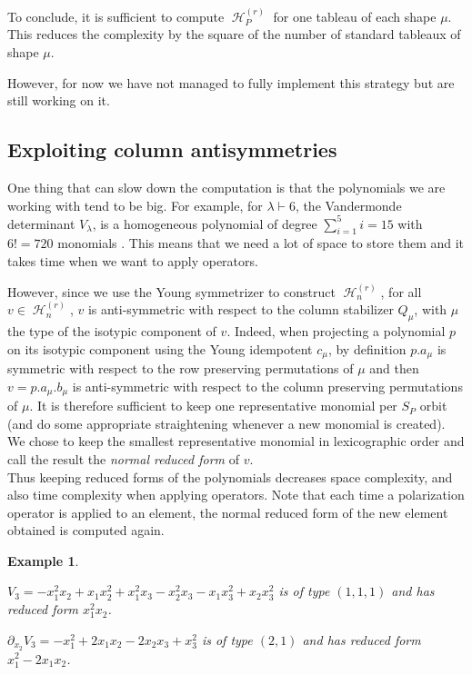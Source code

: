 \documentclass[letter,12pt]{article}
\newcommand{\pauline}[1]{\todo[linecolor=blue,backgroundcolor=cyan!25,bordercolor=blue]{#1}}
\DeclareMathOperator{\harmonics}{\mathcal{H}}
\newtheorem{example}{Example}
\begin{document}
	To conclude, it is sufficient to compute $\harmonics_P^{(r)}$ for one tableau of each shape $\mu$. This reduces the complexity by the square of the number of standard tableaux of shape $\mu$.
	
	However, for now we have not managed to fully implement this strategy but are still working on it. 
	
	\subsection{Exploiting column antisymmetries}
	
	One thing that can slow down the computation is that the polynomials we are working with tend to be big. For example, for $\lambda \vdash 6$, the Vandermonde determinant $V_\lambda$, is a homogeneous polynomial of degree $\sum_{i=1}^{5}i = 15$ with $6!=720$ monomials . This means that we need a lot of space to store them and it takes time when we want to apply operators. 
	
	However, since we use the Young symmetrizer to construct $\harmonics_{n}^{(r)}$, for all $v \in \harmonics_{n}^{(r)}$, $v$ is anti-symmetric with respect to the column stabilizer $Q_\mu$, with $\mu$ the type of the isotypic component of $v$. Indeed, when projecting a polynomial $p$ on its isotypic component using the Young idempotent $c_\mu$, by definition $p.a_\mu$ is symmetric with respect to the row preserving permutations of $\mu$ and then $v = p.a_\mu.b_\mu$ is anti-symmetric with respect to the column preserving permutations of $\mu$. 
	It is therefore sufficient to keep one representative monomial per $S_P$ orbit \pauline{$S_P$ orbit?} (and do some appropriate straightening whenever a new monomial is created). We chose to keep the smallest representative monomial in lexicographic order and call the result the \emph{normal reduced form} of $v$. \\
	
	Thus keeping reduced forms of the polynomials decreases space complexity, and also time complexity when applying operators. Note that each time a polarization operator is applied to an element, the normal reduced form of the new element obtained is computed again. 
	
	\begin{example} ~
		
		$V_{3} = -x_{1}^{2} x_{2} + x_{1} x_{2}^{2} + x_{1}^{2} x_{3} - x_{2}^{2} x_{3} - x_{1} x_{3}^{2} + x_{2} x_{3}^{2}$ is of type $(1,1,1)$ and has reduced form $x_1^2x_2$.
		
		$\partial_{x_2}V_{3} = -x_{1}^{2} + 2 x_{1} x_{2} - 2 x_{2} x_{3} + x_{3}^{2}$ is of type $(2,1)$ and has reduced form $x_1^2 - 2x_1x_2$.
	\end{example}
\end{document}
